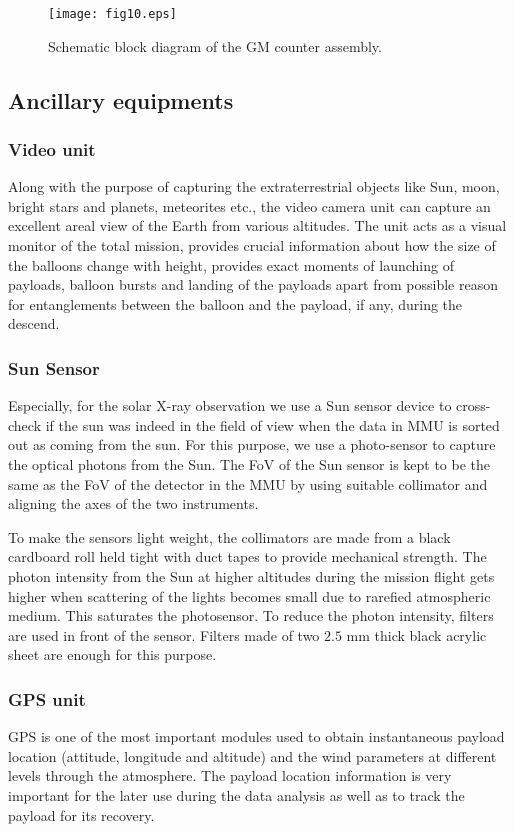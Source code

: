 \begin{figure}[h]
  \centering
  \texttt{[image: fig10.eps]}
  \caption{Schematic block diagram of the GM counter assembly.}
   \label{fig:gmc}
\end{figure}

\subsection{Ancillary equipments}
\label{ssec:anci}

\subsubsection{Video unit}
\label{sssec:vdu}
Along with the purpose of capturing the extraterrestrial objects like Sun, moon, 
bright stars and planets, meteorites etc., the video camera unit
can capture an excellent areal view of the Earth from various altitudes. 
The unit acts as a visual monitor of the total mission, provides crucial information
about how the size of the balloons change with height, provides exact moments of
launching of payloads, balloon bursts and landing of the payloads apart from possible 
reason for entanglements between the balloon and the payload, if any, during the descend. 

\subsubsection{Sun Sensor}
\label{sssec:ss}
Especially, for the solar X-ray observation we use a Sun sensor device to cross-check if
the sun was indeed in the field of view when the data in MMU is sorted out as coming from the sun. 
For this purpose, we use a photo-sensor to capture the optical photons from the Sun. 
The FoV of the Sun sensor is kept to be the same
as the FoV of the detector in the MMU by using suitable collimator and aligning
the axes of the two instruments. 

To make the sensors light weight, the collimators are made from a black cardboard roll
held tight with duct tapes to provide mechanical strength. The photon 
intensity from the Sun at higher altitudes during the mission flight gets higher
when scattering of the lights becomes small due to rarefied atmospheric medium.
This saturates the photosensor. To reduce the photon intensity, filters are used in front of the
sensor. Filters made of two $2.5$ mm thick black acrylic sheet are enough for this purpose.

\subsubsection{GPS unit}
\label{sssec:gps}
GPS is one of the most important modules used to obtain instantaneous
payload location (attitude, longitude and altitude) and the wind
parameters at different levels through the atmosphere. The payload location
information is very important for the later use during the data analysis
as well as to track the payload for its recovery.

